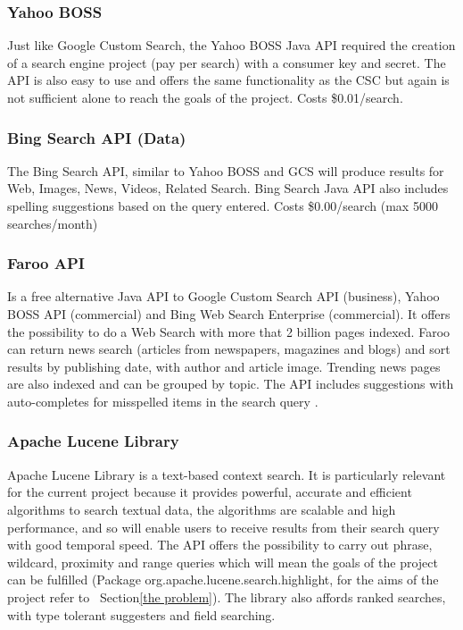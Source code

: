 \documentclass[10pt]{article}
\begin{document}
\subsubsection{Yahoo BOSS}
Just like Google Custom Search, the Yahoo BOSS Java API required the creation of a search engine project (pay per search) with a consumer key and secret. The API is also easy to use and offers the same functionality as the CSC but again is not sufficient alone to reach the goals of the project. Costs \$0.01/search.

\subsubsection{Bing Search API (Data)}
The Bing Search API, similar to Yahoo BOSS and GCS will produce results for Web, Images, News, Videos, Related Search. Bing Search Java API also includes spelling suggestions based on the query entered. Costs \$0.00/search (max 5000 searches/month)

\subsubsection{Faroo API}
Is a free alternative Java API to Google Custom Search API (business), Yahoo BOSS API  (commercial) and Bing Web Search Enterprise (commercial). It offers the possibility to do a Web Search with more that 2 billion pages indexed. Faroo can return news search (articles from newspapers, magazines and blogs) and sort results by publishing date, with author and article image. Trending news pages are also indexed and can be grouped by topic. The API includes suggestions with auto-completes for misspelled items in the search query \cite{faroo}.

\subsubsection{Apache Lucene Library}\label{apache}
Apache Lucene Library is a text-based context search. It is particularly relevant for the current project because it provides powerful, accurate and efficient algorithms to search textual data, the algorithms are scalable and high performance, and so will enable users to receive results from their search query with good temporal speed. The API offers the possibility to carry out phrase, wildcard, proximity and range queries which will mean the goals of the project can be fulfilled (Package org.apache.lucene.search.highlight, for the aims of the project refer to ~Section\ref{the problem}). The library also affords ranked searches, with type tolerant suggesters and field searching.
\end{document}
